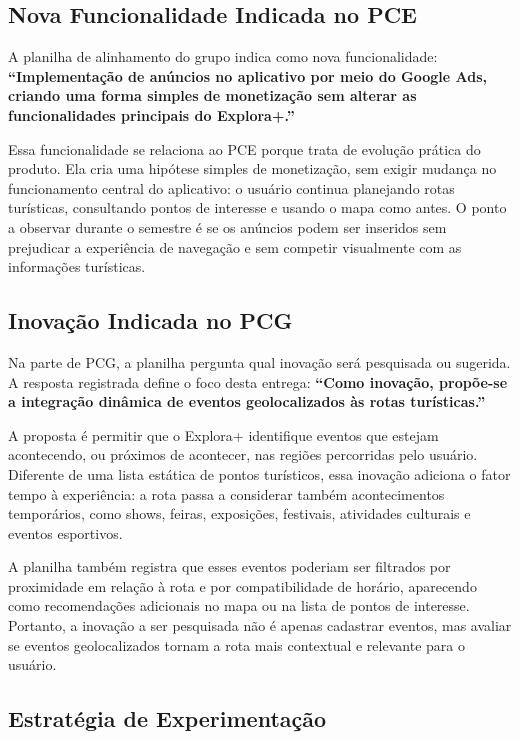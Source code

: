 \documentclass[12pt, a4paper]{article}
\begin{document}
\subsection{Nova Funcionalidade Indicada no PCE}

A planilha de alinhamento do grupo indica como nova funcionalidade: \textbf{``Implementa\c{c}\~ao de an\'uncios no aplicativo por meio do Google Ads, criando uma forma simples de monetiza\c{c}\~ao sem alterar as funcionalidades principais do Explora+.''}

Essa funcionalidade se relaciona ao PCE porque trata de evolu\c{c}\~ao pr\'atica do produto. Ela cria uma hip\'otese simples de monetiza\c{c}\~ao, sem exigir mudan\c{c}a no funcionamento central do aplicativo: o usu\'ario continua planejando rotas tur\'isticas, consultando pontos de interesse e usando o mapa como antes. O ponto a observar durante o semestre \'e se os an\'uncios podem ser inseridos sem prejudicar a experi\^encia de navega\c{c}\~ao e sem competir visualmente com as informa\c{c}\~oes tur\'isticas.

\subsection{Inova\c{c}\~ao Indicada no PCG}

Na parte de PCG, a planilha pergunta qual inova\c{c}\~ao ser\'a pesquisada ou sugerida. A resposta registrada define o foco desta entrega: \textbf{``Como inova\c{c}\~ao, prop\~oe-se a integra\c{c}\~ao din\^amica de eventos geolocalizados \`as rotas tur\'isticas.''}

A proposta \'e permitir que o Explora+ identifique eventos que estejam acontecendo, ou pr\'oximos de acontecer, nas regi\~oes percorridas pelo usu\'ario. Diferente de uma lista est\'atica de pontos tur\'isticos, essa inova\c{c}\~ao adiciona o fator tempo \`a experi\^encia: a rota passa a considerar tamb\'em acontecimentos tempor\'arios, como shows, feiras, exposi\c{c}\~oes, festivais, atividades culturais e eventos esportivos.

A planilha tamb\'em registra que esses eventos poderiam ser filtrados por proximidade em rela\c{c}\~ao \`a rota e por compatibilidade de hor\'ario, aparecendo como recomenda\c{c}\~oes adicionais no mapa ou na lista de pontos de interesse. Portanto, a inova\c{c}\~ao a ser pesquisada n\~ao \'e apenas cadastrar eventos, mas avaliar se eventos geolocalizados tornam a rota mais contextual e relevante para o usu\'ario.

\subsection{Estrat\'egia de Experimenta\c{c}\~ao}
\end{document}
